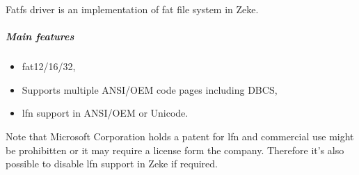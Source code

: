 Fatfs driver is an implementation of \acf{fat} file system in Zeke.

\subparagraph{Main features}
\begin{itemize}
    \item \acs{fat}12/16/32,
    \item Supports multiple ANSI/OEM code pages including DBCS,
    \item \acf{lfn} support in ANSI/OEM or Unicode.
\end{itemize}

Note that Microsoft Corporation holds a patent for \ac{lfn} and commercial
use might be prohibitten or it may require a license form the company.
Therefore it's also possible to disable \acs{lfn} support in Zeke if required.

